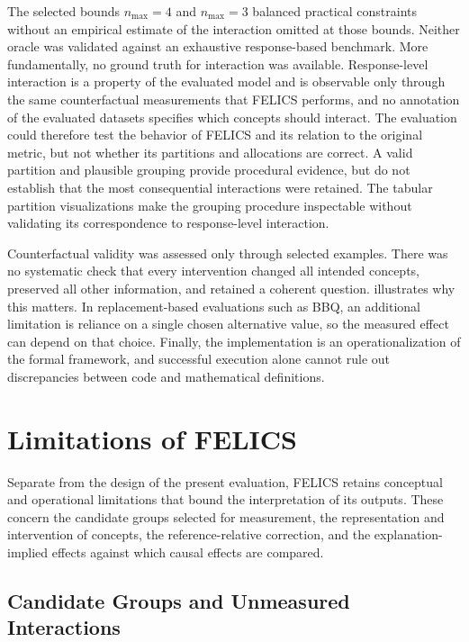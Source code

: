 The selected bounds $n_{\max}=4$ and $n_{\max}=3$ balanced practical constraints without an empirical estimate of the interaction omitted at those bounds. Neither oracle was validated against an exhaustive response-based benchmark. More fundamentally, no ground truth for interaction was available. Response-level interaction is a property of the evaluated model and is observable only through the same counterfactual measurements that FELICS performs, and no annotation of the evaluated datasets specifies which concepts should interact. The evaluation could therefore test the behavior of FELICS and its relation to the original metric, but not whether its partitions and allocations are correct. A valid partition and plausible grouping provide procedural evidence, but do not establish that the most consequential interactions were retained. The tabular partition visualizations make the grouping procedure inspectable without validating its correspondence to response-level interaction.

Counterfactual validity was assessed only through selected examples. There was no systematic check that every intervention changed all intended concepts, preserved all other information, and retained a coherent question.  illustrates why this matters. In replacement-based evaluations such as BBQ, an additional limitation is reliance on a single chosen alternative value, so the measured effect can depend on that choice. Finally, the implementation is an operationalization of the formal framework, and successful execution alone cannot rule out discrepancies between code and mathematical definitions.

\section{Limitations of FELICS}
\label{sec:felics_limitations}

Separate from the design of the present evaluation, FELICS retains conceptual and operational limitations that bound the interpretation of its outputs. These concern the candidate groups selected for measurement, the representation and intervention of concepts, the reference-relative correction, and the explanation-implied effects against which causal effects are compared.

\subsection{Candidate Groups and Unmeasured Interactions}

